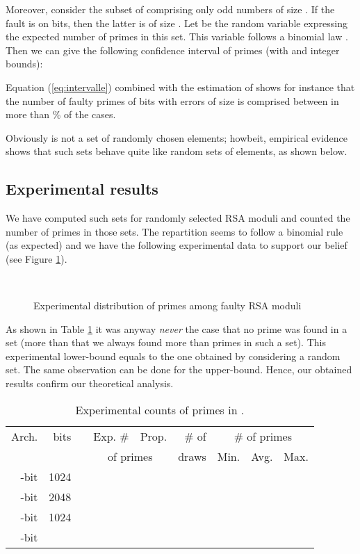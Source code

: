 \documentclass{article}
\begin{document}
Moreover, consider the subset of  comprising only odd
numbers of size . If the fault is on  bits, then the latter is
of size . Let  be the random variable expressing the expected number of primes in this set.
This variable follows a binomial law . 
Then we can give the following confidence interval of primes (with 
and  integer bounds): 

Equation
(\ref{eq:intervalle}) combined with the estimation of  
shows for instance that the number of faulty primes of  bits
with errors of size  is comprised between  in more than
\% of the cases.


Obviously  is not a set of randomly chosen elements;
howbeit, empirical evidence shows that such sets behave quite like
random sets of elements, as shown below.

\subsection{Experimental results}
We have computed such sets for randomly selected RSA moduli and
counted the number of primes in those sets. The repartition seems to
follow a binomial rule (as expected) and we have the following experimental data to
support our belief (see Figure \ref{fig:prime_rep}).

\begin{figure}[htbp]
 \centering
 \\
 \caption{Experimental distribution of primes among faulty RSA moduli}
 \label{fig:prime_rep}
\end{figure}

As shown in Table \ref{tab:ppcount} it was anyway \textit{never} the case
that no prime was found in a set  (more than that we
always found more than  primes in such a set). This experimental lower-bound equals to the one obtained by considering a random set. The same observation can be done for the upper-bound.
Hence, our obtained results confirm our theoretical analysis.

\begin{table}[htb]\begin{center}
\begin{tabular}{|r|r|r|r|r||r|r|r|r|}
\hline
Arch. & bits &  & Exp. \# & Prop. & \#
of & \multicolumn{3}{|c|}{\# of primes} \\
      & & &\multicolumn{2}{|c||}{of primes}&draws & Min.  & Avg.  & Max. \\
\hline
-bit & 1024 &  &  &  &  &  &  & \\
-bit & 2048 &  &  &  &  &  &  & \\
-bit & 1024 &  &  &  &  &  &  & \\
-bit &  &  &  & & & &  & \\
\hline
\end{tabular}
\caption{Experimental counts of primes in .}\label{tab:ppcount}
\end{center}
\end{table}
\end{document}
